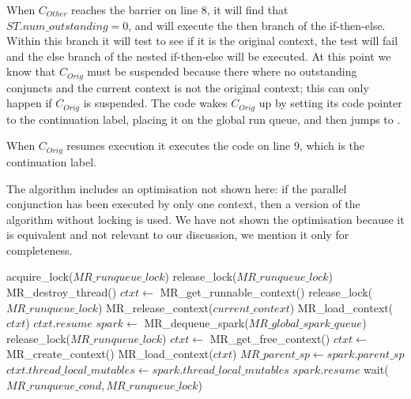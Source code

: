 \begin{description}
    When $C_{Other}$ reaches the barrier on line 8,
    it will find that $ST.num\_outstanding = 0$,
    and will execute the then branch of the if-then-else.
    Within this branch it will test to see if it is the original
    context,
    the test will fail and the else branch of the nested if-then-else
    will be executed.
    At this point we know that $C_{Orig}$ must be suspended because
    there where no outstanding conjuncts and the current context is not
    the original context;
    this can only happen if $C_{Orig}$ is suspended.
    The code wakes $C_{Orig}$ up by
    setting its code pointer to the continuation label,
    placing it on the global run queue,
    and then jumps to \getglobalwork.

    When $C_{Orig}$ resumes execution it executes the code on line 9,
    which is the continuation label.

\end{description}

The algorithm includes an optimisation not shown here:
if the parallel conjunction has been executed by only one context,
then a version of the algorithm without locking is used.
We have not shown the optimisation because it is equivalent and not relevant
to our discussion,
we mention it only for completeness.

\begin{algorithm}
\begin{algorithmic}
  \State acquire\_lock($MR\_runqueue\_lock$)
  \Loop
      \State release\_lock($MR\_runqueue\_lock$)
      \State MR\_destroy\_thread()
    \EndIf
    \State $ctxt \gets$ MR\_get\_runnable\_context()
      \State release\_lock($MR\_runqueue\_lock$)
        \State MR\_release\_context($current\_context$)
      \EndIf
      \State MR\_load\_context($ctxt$)
      \Goto $ctxt.resume$
    \EndIf
    \State $spark \gets$ MR\_dequeue\_spark($MR\_global\_spark\_queue$)
      \State release\_lock($MR\_runqueue\_lock$)
        \State $ctxt \gets$ MR\_get\_free\_context()
          \State $ctxt \gets$ MR\_create\_context()
        \EndIf
        \State MR\_load\_context($ctxt$)
      \EndIf
      \State $MR\_parent\_sp \gets spark.parent\_sp$
      \State $ctxt.thread\_local\_mutables \gets
        spark.thread\_local\_mutables$
      \Goto $spark.resume$
    \EndIf
    \State wait($MR\_runqueue\_cond, MR\_runqueue\_lock$)
  \EndLoop
\EndProcedure
\end{algorithmic}
\caption{\getglobalwork}
\label{alg:MR_get_global_work}
\end{algorithm}

